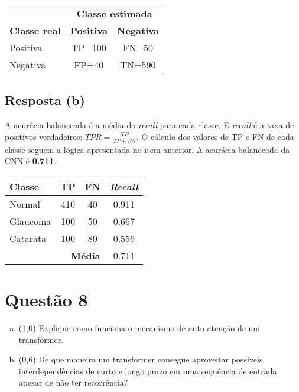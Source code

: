 \documentclass[final,3p]{elsarticle}
\numberwithin{equation}{section}
\begin{document}
        \begin{table}[H]
            \centering
            \begin{tabular}{l c c}
                \toprule
                & \multicolumn{2}{c}{\textbf{Classe estimada}} \\
                \textbf{Classe real} & \textbf{Positiva} & \textbf{Negativa} \\
                \midrule
                Positiva & TP=100 & FN=50 \\
                Negativa & FP=40 & TN=590 \\
                \bottomrule
            \end{tabular}
        \end{table}

    \subsection{Resposta \textbf{(b)}}

        A acurácia balanceada é a média do \emph{recall} para cada classe. E \emph{recall} é a taxa de positivos verdadeiros: $TPR = \frac{TP}{TP+FN}$. O cálculo dos valores de TP e FN de cada classe seguem a lógica apresentada no item anterior. A acurácia balanceada da CNN é \textbf{0.711}.

        \begin{table}[H]
            \centering
            \begin{tabular}{l c c c}
                \toprule
                \textbf{Classe} & \textbf{TP} & \textbf{FN} & \textbf{\emph{Recall}} \\
                \midrule
                Normal   & 410 & 40 & 0.911 \\
                Glaucoma & 100 & 50 & 0.667 \\
                Catarata & 100 & 80 & 0.556 \\
                \midrule
                         & \multicolumn{2}{r}{\textbf{Média}} & 0.711 \\

                \bottomrule
            \end{tabular}
        \end{table}

\section{Questão 8}

    \begin{enumerate}[(a)]
        \item (1,0) Explique como funciona o mecanismo de auto-atenção de um transformer.
        \item (0,6) De que maneira um transformer consegue aproveitar possíveis interdependências de curto e longo prazo em uma sequência de entrada apesar de não ter recorrência?
    \end{enumerate}
\end{document}
